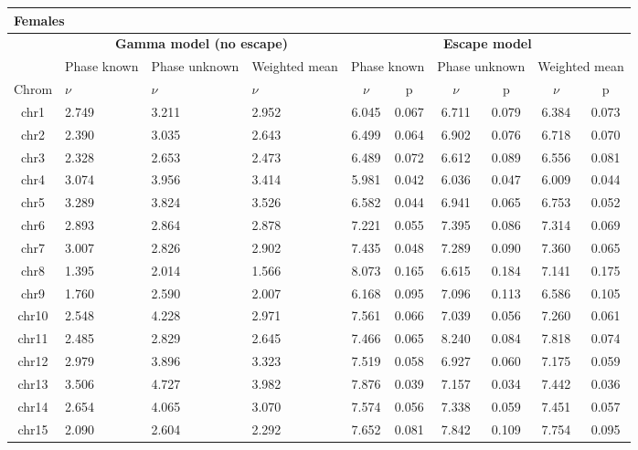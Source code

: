 \clearpage 
\begin{table}[!h] \centering
    \scriptsize
    \begin{tabular}{|c|p{1.1cm}p{1.2cm}p{1.3cm}|cccccc|} \hline 
    \multicolumn{10}{|l|}{\textbf{Females}} \\ \hline
    & \multicolumn{3}{c|}{\textbf{Gamma model (no escape)}} & \multicolumn{6}{c|}{\textbf{Escape model}} \\
    & Phase known & Phase \mbox{unknown} & Weighted mean & 
    \multicolumn{2}{c}{Phase known} & \multicolumn{2}{c}{Phase unknown} & \multicolumn{2}{c|}{Weighted mean} \\
    Chrom & $\nu$ & $\nu$ & $\nu$ & $\nu$ & p & $\nu$ & p & $\nu$ & p \\ \hline
    chr1 & 2.749 & 3.211 & 2.952 & 6.045 & 0.067 & 6.711 & 0.079 & 6.384 & 0.073 \\
    chr2 & 2.390 & 3.035 & 2.643 & 6.499 & 0.064 & 6.902 & 0.076 & 6.718 & 0.070 \\
    chr3 & 2.328 & 2.653 & 2.473 & 6.489 & 0.072 & 6.612 & 0.089 & 6.556 & 0.081 \\
    chr4 & 3.074 & 3.956 & 3.414 & 5.981 & 0.042 & 6.036 & 0.047 & 6.009 & 0.044 \\
    chr5 & 3.289 & 3.824 & 3.526 & 6.582 & 0.044 & 6.941 & 0.065 & 6.753 & 0.052 \\
    chr6 & 2.893 & 2.864 & 2.878 & 7.221 & 0.055 & 7.395 & 0.086 & 7.314 & 0.069 \\
    chr7 & 3.007 & 2.826 & 2.902 & 7.435 & 0.048 & 7.289 & 0.090 & 7.360 & 0.065 \\
    chr8 & 1.395 & 2.014 & 1.566 & 8.073 & 0.165 & 6.615 & 0.184 & 7.141 & 0.175 \\
    chr9 & 1.760 & 2.590 & 2.007 & 6.168 & 0.095 & 7.096 & 0.113 & 6.586 & 0.105 \\
    chr10 & 2.548 & 4.228 & 2.971 & 7.561 & 0.066 & 7.039 & 0.056 & 7.260 & 0.061 \\
    chr11 & 2.485 & 2.829 & 2.645 & 7.466 & 0.065 & 8.240 & 0.084 & 7.818 & 0.074 \\
    chr12 & 2.979 & 3.896 & 3.323 & 7.519 & 0.058 & 6.927 & 0.060 & 7.175 & 0.059 \\
    chr13 & 3.506 & 4.727 & 3.982 & 7.876 & 0.039 & 7.157 & 0.034 & 7.442 & 0.036 \\
    chr14 & 2.654 & 4.065 & 3.070 & 7.574 & 0.056 & 7.338 & 0.059 & 7.451 & 0.057 \\
    chr15 & 2.090 & 2.604 & 2.292 & 7.652 & 0.081 & 7.842 & 0.109 & 7.754 & 0.095 \\

\end{tabular}
\end{table}
